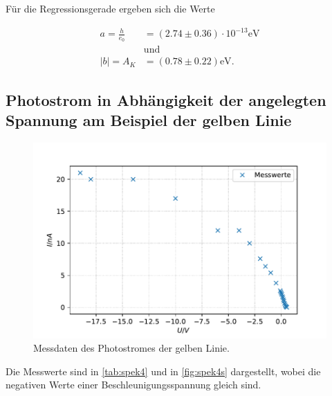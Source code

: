 Für die Regressionsgerade ergeben sich die Werte

\begin{align}
  a = \frac{h}{e_0} &= (2.74 ± 0.36) \cdot 10^{-13} \unit{\eV} \\
  &\text{und} \\
  |b| = A_K &= (0.78 ±  0.22) \unit{\eV}.
\end{align}

\subsection{Photostrom in Abhängigkeit der angelegten Spannung am Beispiel der gelben Linie}
\begin{figure}
  \center
  \caption{Messdaten des Photostromes der gelben Linie.}\label{fig:spek4s}
  \includegraphics[width=0.8\linewidth]{pictures/spek4s.pdf}
\end{figure}

Die Messwerte sind in \autoref{tab:spek4} und in \autoref{fig:spek4s} dargestellt, wobei die negativen Werte einer Beschleunigungsspannung gleich sind.